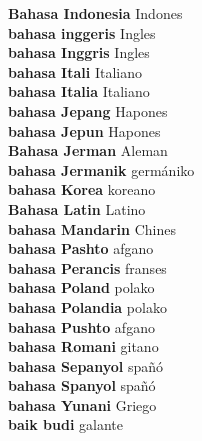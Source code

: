 \textbf{ Bahasa Indonesia  } Indones \\
\textbf{ bahasa inggeris  } Ingles \\
\textbf{ bahasa Inggris  } Ingles \\
\textbf{ bahasa Itali  } Italiano \\
\textbf{ bahasa Italia  } Italiano \\
\textbf{ bahasa Jepang  } Hapones \\
\textbf{ bahasa Jepun  } Hapones \\
\textbf{ Bahasa Jerman  } Aleman \\
\textbf{ bahasa Jermanik  } germániko \\
\textbf{ bahasa Korea  } koreano \\
\textbf{ Bahasa Latin  } Latino \\
\textbf{ bahasa Mandarin  } Chines \\
\textbf{ bahasa Pashto  } afgano \\
\textbf{ bahasa Perancis  } franses \\
\textbf{ bahasa Poland  } polako \\
\textbf{ bahasa Polandia  } polako \\
\textbf{ bahasa Pushto  } afgano \\
\textbf{ bahasa Romani  } gitano \\
\textbf{ bahasa Sepanyol  } spañó \\
\textbf{ bahasa Spanyol  } spañó \\
\textbf{ bahasa Yunani  } Griego \\
\textbf{ baik budi  } galante \\
